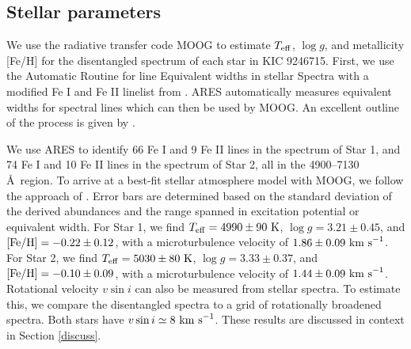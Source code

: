 \subsection{Stellar parameters}\label{parameters}
We use the radiative transfer code MOOG \citep{sne73} to estimate $T_{\rm{eff}}$, $\log g$, and metallicity [Fe/H] for the disentangled spectrum of each star in KIC 9246715. First, we use the Automatic Routine for line Equivalent widths in stellar Spectra \citep[ARES,][]{Sousa_2007} with a modified Fe I and Fe II linelist from \citet{tsa13}. ARES automatically measures equivalent widths for spectral lines which can then be used by MOOG. An excellent outline of the process is given by \citet{Sousa_2014}.

We use ARES to identify 66 Fe I and 9 Fe II lines in the spectrum of Star 1, and 74 Fe I and 10 Fe II lines in the spectrum of Star 2, all in the 4900--7130 \AA \ region. To arrive at a best-fit stellar atmosphere model with MOOG, we follow the approach of \citet{mag13}. Error bars are determined based on the standard deviation of the derived abundances and the range spanned in excitation potential or equivalent width. For Star 1, we find $T_{\rm{eff}} = 4990 \pm 90 \ \rm{K}$, $\log g = 3.21 \pm 0.45$, and $\rm{[Fe/H]} = -0.22 \pm 0.12$, with a microturbulence velocity of $1.86 \pm 0.09 \ \rm{km \ s}^{-1}$. For Star 2, we find $T_{\rm{eff}} = 5030 \pm 80 \ \rm{K}$, $\log g = 3.33 \pm 0.37$, and $\rm{[Fe/H]} = -0.10 \pm 0.09$, with a microturbulence velocity of $1.44 \pm 0.09 \ \rm{km \ s}^{-1}$. Rotational velocity $v \sin i$ can also be measured from stellar spectra. To estimate this, we compare the disentangled spectra to a grid of rotationally broadened spectra. Both stars have $v \sin i \simeq 8 \ \rm{km \ s}^{-1}$. These results are discussed in context in Section \ref{discuss}.
